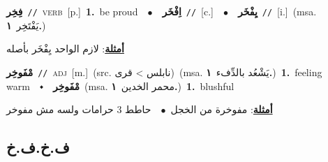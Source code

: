 \documentclass[10pt,a4paper,twoside]{article} %
\begin{document}
\begin{multicols}{2}
{\setlength\topsep{0pt}\textbf{\foreignlanguage{arabic}{فِخِر}}\ {\color{gray}\texttt{//}\color{black}}\ \textsc{verb}\ [p.]\ \textbf{1.}~be proud\ \ $\bullet$\ \ \setlength\topsep{0pt}\textbf{\foreignlanguage{arabic}{اِفْخَر}}\ {\color{gray}\texttt{//}\color{black}}\ [c.]\ \ $\bullet$\ \ \setlength\topsep{0pt}\textbf{\foreignlanguage{arabic}{يِفْخَر}}\ {\color{gray}\texttt{//}\color{black}}\ [i.]\ \color{gray}(msa. \foreignlanguage{arabic}{يَفْتَخِر}~\foreignlanguage{arabic}{\textbf{١.}})\color{black}\  \begin{flushright}\color{gray}\foreignlanguage{arabic}{\textbf{\underline{\foreignlanguage{arabic}{أمثلة}}}: لازم الواحد يِفْخَر بأصله}\end{flushright}\color{black}} \vspace{2mm}

{\setlength\topsep{0pt}\textbf{\foreignlanguage{arabic}{مْفَوخِر}}\ {\color{gray}\texttt{//}\color{black}}\ \textsc{adj}\ [m.]\ (src. \color{gray}\foreignlanguage{arabic}{نابلس > قرى}\color{black})\ \color{gray}(msa. \foreignlanguage{arabic}{يَشْعُد بالدِّفء}~\foreignlanguage{arabic}{\textbf{١.}})\color{black}\ \textbf{1.}~feeling warm\ \ $\smblkdiamond$\ \ \setlength\topsep{0pt}\textbf{\foreignlanguage{arabic}{مْفَوخِر}}\ \color{gray}(msa. \foreignlanguage{arabic}{محمر الخدين}~\foreignlanguage{arabic}{\textbf{١.}})\color{black}\ \textbf{1.}~blushful\  \begin{flushright}\color{gray}\foreignlanguage{arabic}{\textbf{\underline{\foreignlanguage{arabic}{أمثلة}}}: مفوخرة من الخجل\ $\bullet$\ \  حاطط 3 حرامات ولسه مش مفوخر}\end{flushright}\color{black}} \vspace{2mm}

\vspace{-3mm}
\subsection*{\color{blue}\foreignlanguage{arabic}{ف.خ.ف.خ}\color{blue}{}} 


\end{multicols}
\end{document}

